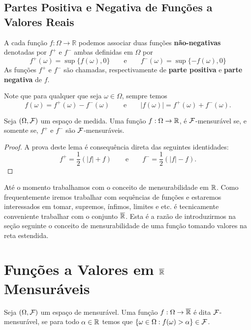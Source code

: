 \subsection*{Partes Positiva e Negativa de Funções a Valores Reais}

A cada função $f:\Omega\to\mathbb{R}$ podemos associar duas funções 
{\bf não-negativas} denotadas por $f^+$ e $f^-$ ambas definidas em $\Omega$
por 
	\[
		f^+(\omega)= \sup\{f(\omega),0\} 
		\qquad
		\text{e}
		\qquad
		f^-(\omega)= \sup\{-f(\omega),0\} 
	\]
As funções $f^+$ e $f^-$ são chamadas, respectivamente 
de {\bf parte positiva} e {\bf parte negativa} de $f$.

Note que para qualquer que seja $\omega\in\Omega$, sempre temos
	\[
		f(\omega) = f^+(\omega)-f^{-}(\omega)
		\qquad
		\text{e}
		\qquad
		|f(\omega)| = f^+(\omega)+f^{-}(\omega).
	\]
	
	
\begin{lema}
	Seja $(\Omega,\mathcal{F})$ um espaço de medida. Uma função 
	$f:\Omega\to\mathbb{R}$, é $\mathcal{F}$-mensurável se, e somente se,
	$f^+$ e $f^-$ são $\mathcal{F}$-mensuráveis.
\end{lema}

\begin{proof}
A prova deste lema é consequência direta das seguintes identidades:
\[
	f^{+} = \frac{1}{2}(|f|+f)
	\qquad
	\text{e}
	\qquad
	f^{-} = \frac{1}{2}(|f|-f).
\]
\end{proof}


Até o momento trabalhamos com o conceito de mensurabilidade em 
$\mathbb{R}$. Como frequentemente iremos trabalhar com sequências de 
funções e estaremos interessados em tomar, supremos, ínfimos,
limites e etc. é tecnicamente conveniente trabalhar com o 
conjunto $\overline{\mathbb{R}}$. Esta é a razão de introduzirmos 
na seção seguinte o conceito de mensurabilidade de uma função 
tomando valores na reta estendida. 






\section{Funções a Valores em $\overline{\mathbb{R}}$ Mensuráveis}

\begin{definicao}
Seja $(\Omega,\mathcal{F})$ um espaço de mensurável. Uma função 
$f:\Omega\to\overline{\mathbb{R}}$ é dita $\mathcal{F}$-mensurável, se para todo
$\alpha\in\mathbb{R}$ temos que 
$\{\omega\in\Omega:f(\omega)>\alpha\}\in\mathcal{F}$.
\end{definicao}


